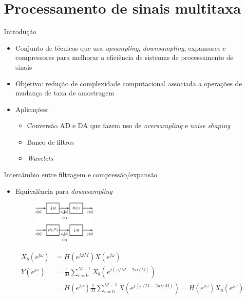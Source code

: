 \section{Processamento de sinais multitaxa}
\begin{slide}{Introdução}
	\begin{itemize}
		\item Conjunto de técnicas que usa \emph{upsampling}, \emph{downsampling}, expansores e compressores para melhorar a eficiência de sistemas de processamento de sinais
		\item Objetivo: redução de complexidade computacional associada a operações de mudança de taxa de amostragem
		\item Aplicações:
			\begin{itemize}
				\item Conversão AD e DA que fazem uso de \emph{oversampling} e \emph{noise shaping}
				\item Banco de filtros
				\item \emph{Wavelets}
			\end{itemize}
	\end{itemize}
\end{slide}

\begin{slide}{Intercâmbio entre filtragem e compressão/expansão}
	\begin{itemize}
		\item Equivalência para \emph{downsampling}
			\begin{figure}
				\centering
				\includegraphics[width=0.3\textwidth]{figs/4-31.eps}
			\end{figure}
			\begin{align*}
				X_b(e^{j\omega}) &=H(e^{j\omega M}) X(e^{j\omega})\\
				Y(e^{j\omega})&= \frac{1}{M} \sum_{i=0}^{M-1} X_b(e^{j(\omega/M - 2\pi i/M)})\\
				&= H(e^{j\omega})\frac{1}{M} \sum_{i=0}^{M-1} X(e^{j(\omega/M - 2\pi i/M)}) = H(e^{j\omega})X_a(e^{j\omega})
			\end{align*}
	\end{itemize}
			
\end{slide}


